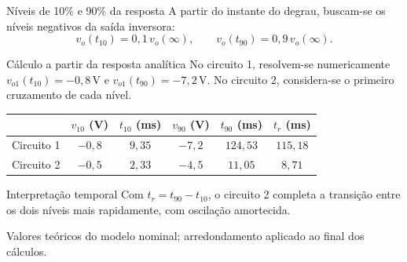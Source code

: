 \begin{frame}{Níveis de 10\% e 90\% da resposta}
  \small
  \setlength{\abovedisplayskip}{4pt}
  \setlength{\belowdisplayskip}{4pt}
  A partir do instante do degrau, buscam-se os níveis negativos da saída inversora:
  \[
    v_o(t_{10})=0{,}1\,v_o(\infty),
    \qquad
    v_o(t_{90})=0{,}9\,v_o(\infty).
  \]

  \begin{block}{Cálculo a partir da resposta analítica}
    No circuito 1, resolvem-se numericamente
    $v_{o1}(t_{10})=-0{,}8\,\mathrm{V}$ e
    $v_{o1}(t_{90})=-7{,}2\,\mathrm{V}$.
    No circuito 2, considera-se o primeiro cruzamento de cada nível.
  \end{block}

  {\centering
    \renewcommand{\arraystretch}{1.0}
    \begin{tabular}{lccccc}
      \toprule
      & $v_{10}$ (V) & $t_{10}$ (ms) & $v_{90}$ (V) & $t_{90}$ (ms) & $t_r$ (ms) \\
      \midrule
      Circuito 1 & $-0{,}8$ & $9{,}35$ & $-7{,}2$ & $124{,}53$ & $115{,}18$ \\
      Circuito 2 & $-0{,}5$ & $2{,}33$ & $-4{,}5$ & $11{,}05$ & $8{,}71$ \\
      \bottomrule
    \end{tabular}
    \par
  }

  \begin{alertblock}{Interpretação temporal}
    Com $t_r=t_{90}-t_{10}$, o circuito 2 completa a transição entre os dois níveis
    mais rapidamente, com oscilação amortecida.
  \end{alertblock}
  \centering\scriptsize
  Valores teóricos do modelo nominal; arredondamento aplicado ao final dos cálculos.
\end{frame}
